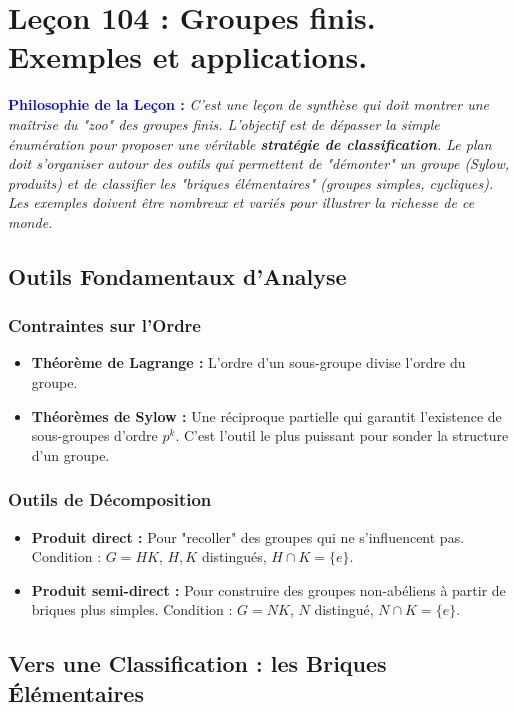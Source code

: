\documentclass[12pt, a4paper, parskip=full]{report}
\theoremstyle{agregstyle}
\newenvironment{philosophie}
  {\par\medskip\noindent\begin{oframed}\noindent\textbf{\textcolor{blue}{Philosophie de la Leçon :}}\itshape}
  {\end{oframed}\par\medskip}
\begin{document}
\newpage
\chapter{Leçon 104 : Groupes finis. Exemples et applications.}

\begin{philosophie}
    C'est une leçon de synthèse qui doit montrer une maîtrise du "zoo" des groupes finis. L'objectif est de dépasser la simple énumération pour proposer une véritable \textbf{stratégie de classification}. Le plan doit s'organiser autour des outils qui permettent de "démonter" un groupe (Sylow, produits) et de classifier les "briques élémentaires" (groupes simples, cycliques). Les exemples doivent être nombreux et variés pour illustrer la richesse de ce monde.
\end{philosophie}

\section{Outils Fondamentaux d'Analyse}
\subsection{Contraintes sur l'Ordre}
\begin{itemize}
    \item \textbf{Théorème de Lagrange :} L'ordre d'un sous-groupe divise l'ordre du groupe.
    \item \textbf{Théorèmes de Sylow :} Une réciproque partielle qui garantit l'existence de sous-groupes d'ordre $p^k$. C'est l'outil le plus puissant pour sonder la structure d'un groupe.
\end{itemize}
\subsection{Outils de Décomposition}
\begin{itemize}
    \item \textbf{Produit direct :} Pour "recoller" des groupes qui ne s'influencent pas. Condition : $G=HK$, $H,K$ distingués, $H \cap K = \{e\}$.
    \item \textbf{Produit semi-direct :} Pour construire des groupes non-abéliens à partir de briques plus simples. Condition : $G=NK$, $N$ distingué, $N \cap K = \{e\}$.
\end{itemize}

\section{Vers une Classification : les Briques Élémentaires}
\end{document}
